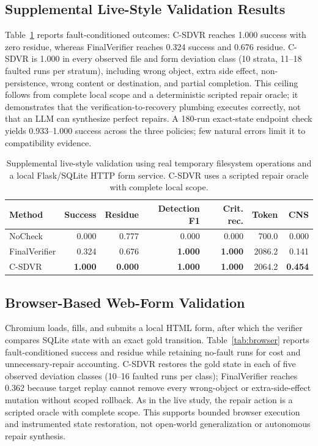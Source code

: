 \documentclass[pdflatex,sn-apa]{sn-jnl}
\begin{document}
\subsection{Supplemental Live-Style Validation Results}

Table~\ref{tab:live} reports fault-conditioned outcomes: C-SDVR reaches 1.000 success with zero residue, whereas FinalVerifier reaches 0.324 success and 0.676 residue. C-SDVR is 1.000 in every observed file and form deviation class (10 strata, 11--18 faulted runs per stratum), including wrong object, extra side effect, non-persistence, wrong content or destination, and partial completion. This ceiling follows from complete local scope and a deterministic scripted repair oracle; it demonstrates that the verification-to-recovery plumbing executes correctly, not that an LLM can synthesize perfect repairs. A 180-run exact-state endpoint check yields 0.933--1.000 success across the three policies; few natural errors limit it to compatibility evidence.

\begin{table}[htbp]
\centering
\caption{Supplemental live-style validation using real temporary filesystem operations and a local Flask/SQLite HTTP form service. C-SDVR uses a scripted repair oracle with complete local scope.}
\label{tab:live}
\small
\begin{tabular}{lrrrrrr}
\toprule
Method & Success & Residue & Detection F1 & Crit. rec. & Token & CNS \\
\midrule
NoCheck & 0.000 & 0.777 & 0.000 & 0.000 & 700.0 & 0.000 \\
FinalVerifier & 0.324 & 0.676 & \textbf{1.000} & \textbf{1.000} & 2086.2 & 0.141 \\
C-SDVR & \textbf{1.000} & \textbf{0.000} & \textbf{1.000} & \textbf{1.000} & 2064.2 & \textbf{0.454} \\
\bottomrule
\end{tabular}
\end{table}

\subsection{Browser-Based Web-Form Validation}

Chromium loads, fills, and submits a local HTML form, after which the verifier compares SQLite state with an exact gold transition. Table~\ref{tab:browser} reports fault-conditioned success and residue while retaining no-fault runs for cost and unnecessary-repair accounting. C-SDVR restores the gold state in each of five observed deviation classes (10--16 faulted runs per class); FinalVerifier reaches 0.362 because target replay cannot remove every wrong-object or extra-side-effect mutation without scoped rollback. As in the live study, the repair action is a scripted oracle with complete scope. This supports bounded browser execution and instrumented state restoration, not open-world generalization or autonomous repair synthesis.
\end{document}
